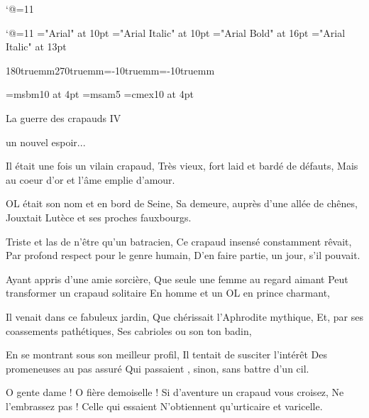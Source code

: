 
%
%
%
%
%
%

\catcode`@=11\relax




\catcode`@=11\relax
\font\LD@Font@Arial="Arial" at 10pt
\font\LD@Font@Arial@Italic="Arial Italic" at 10pt
\font\LD@Font@Big@Arial="Arial Bold" at 16pt
\font\LD@Font@Big@Arial@Italic="Arial Italic" at 13pt

\hsize180truemm\vsize 270truemm\hoffset=-10truemm\voffset=-10truemm
\parindent3mm
\overfullrule=0pt

\font\fourbb=msbm10 at 4pt
\font\fivemsa=msam5
\font\fourex=cmex10 at 4pt

\null
\vfill\bigskip\bigskip\bigskip
\twocolumns
\centerline{\LD@Font@Big@Arial La guerre des crapauds IV}
\centerline{\LD@Font@Big@Arial@Italic un nouvel espoir...}
\bigskip

\noindent\LD@Font@Arial
Il était une fois un vilain crapaud,\pn
Très vieux, fort laid et bardé de défauts,\pn
Mais au coeur d'or et l'âme emplie d'amour.
\bigskip

\noindent
OL était son nom et en bord de Seine,\pn
Sa demeure, auprès d'une allée de chênes,\pn
Jouxtait Lutèce et ses proches fauxbourgs.
\bigskip

\noindent
Triste et las de n'être qu'un batracien,\pn
Ce crapaud insensé constamment rêvait,\pn
Par profond respect pour le genre humain,\pn
D'en faire partie, un jour, s'il pouvait.
\bigskip

\noindent
Ayant appris d'une amie sorcière,\pn
Que seule une femme au regard aimant\pn
Peut transformer un crapaud solitaire\pn
En homme et un OL en prince charmant,
\bigskip

\noindent
Il venait dans ce fabuleux jardin,\pn
Que chérissait l'Aphrodite mythique,\pn
Et, par ses coassements pathétiques,\pn
Ses cabrioles ou son ton badin,
\bigskip

\noindent
En se montrant sous son meilleur profil,\pn
Il tentait de susciter l'intérêt\pn
Des promeneuses au pas assuré\pn
Qui passaient , sinon, sans battre d'un cil.
\bigskip

\noindent
O gente dame ! O fière demoiselle !\pn
Si d'aventure un crapaud vous croisez,\pn
Ne l'embrassez pas ! Celle qui essaient\pn
N'obtiennent qu'urticaire et varicelle.
\bigskip


